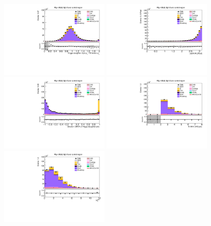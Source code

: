 \begin{figure}[tbp]
  \begin{center}
    \includegraphics[width=0.48\textwidth]{figures/wlnhbb2016/resolved/WmnWHLightFlavorCR_pTBalanceDijetW.pdf}
    \includegraphics[width=0.48\textwidth]{figures/wlnhbb2016/resolved/WmnWHLightFlavorCR_deltaPhiVH.pdf}
    \includegraphics[width=0.48\textwidth]{figures/wlnhbb2016/resolved/WmnWHLightFlavorCR_bDiscrMax.pdf}
    \includegraphics[width=0.48\textwidth]{figures/wlnhbb2016/resolved/WmnWHLightFlavorCR_nJet.pdf}
    \includegraphics[width=0.48\textwidth]{figures/wlnhbb2016/resolved/WmnWHLightFlavorCR_nSoft5.pdf}

\end{center}
\end{figure}

